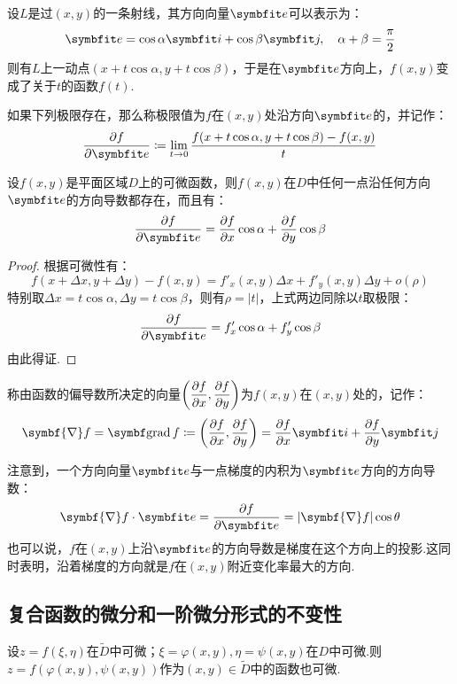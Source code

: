 设$L$是过$(x,y)$的一条射线，其方向向量$\vb{e}$可以表示为：
\[\vb{e} = \cos\alpha\vb{i} + \cos\beta\vb{j},\quad\alpha+\beta=\frac{\pi}{2}\]
则有$L$上一动点$(x+t\cos\alpha,y+t\cos\beta)$，于是在$\vb{e}$方向上，$f(x,y)$变成了关于$t$的函数$f(t)$.
\begin{definition}
    如果下列极限存在，那么称极限值为$f$在$(x,y)$处沿方向$\vb{e}$的，并记作：
    \[\pdv{f}{\vb{e}} \coloneq \lim_{t \to 0}\frac{f(x+t\cos\alpha,y+t\cos\beta)-f(x,y)}{t}\]
\end{definition}

\begin{theorem}
    设$f(x,y)$是平面区域$D$上的可微函数，则$f(x,y)$在$D$中任何一点沿任何方向$\vb{e}$的方向导数都存在，而且有：
    \[\pdv{f}{\vb{e}} = \pdv{f}{x}\cos\alpha + \pdv{f}{y}\cos\beta\]
\end{theorem}

\begin{proof}
    根据可微性有：
    \[f(x+\Delta x,y+\Delta y) - f(x,y) = f'_x(x,y)\Delta x + f'_y(x,y)\Delta y + o(\rho)\]
    特别取$\Delta x = t\cos\alpha,\Delta y = t\cos\beta$，则有$\rho = |t|$，上式两边同除以$t$取极限：
    \[\pdv{f}{\vb{e}} = f'_x\cos\alpha + f'_y\cos\beta\]
    由此得证.
\end{proof}

\begin{definition}
    称由函数的偏导数所决定的向量$\displaystyle\left(\pdv{f}{x},\pdv{f}{y}\right)$为$f(x,y)$在$(x,y)$处的，记作：
    \[\symbf{\nabla} f = \grad f \coloneq \left(\pdv{f}{x},\pdv{f}{y}\right) = \pdv{f}{x}\vb{i} + \pdv{f}{y}\vb{j}\]
\end{definition}

注意到，一个方向向量$\vb{e}$与一点梯度的内积为$\vb{e}$方向的方向导数：
\[\symbf{\nabla} f \cdot \vb{e} = \pdv{f}{\vb{e}} = |\symbf{\nabla}f|\cos\theta\]
也可以说，$f$在$(x,y)$上沿$\vb{e}$的方向导数是梯度在这个方向上的投影.这同时表明，沿着梯度的方向就是$f$在$(x,y)$附近变化率最大的方向.


\subsection{复合函数的微分和一阶微分形式的不变性}
\begin{theorem}
    设$z = f(\xi,\eta)$在$\tilde{D}$中可微；$\xi = \varphi(x,y),\eta = \psi(x,y)$在$D$中可微.则$z = f(\varphi(x,y),\psi(x,y))$作为$(x,y)\in\tilde{D}$中的函数也可微.
\end{theorem}

